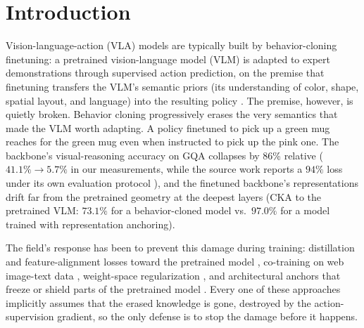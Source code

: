 \documentclass{article}
\begin{document}

\section{Introduction}
\label{sec:intro}

Vision-language-action (VLA) models are typically built by behavior-cloning finetuning: a
pretrained vision-language model (VLM) is adapted to expert demonstrations through supervised
action prediction, on the premise that finetuning transfers the VLM's semantic priors (its
understanding of color, shape, spatial layout, and language) into the resulting policy
\cite{brohan2022rt1,zitkovich2023rt2,driess2023palme,kim2024openvla,wang2025vlaadapter,starvla2026}.
The premise, however, is quietly broken. Behavior cloning progressively erases the very
semantics that made the VLM worth adapting. A policy finetuned to pick up a green mug reaches
for the green mug even when instructed to pick up the pink one. The backbone's
visual-reasoning accuracy on GQA \cite{hudson2019gqa} collapses by 86\% relative
($41.1\% \rightarrow 5.7\%$ in our measurements, while the source work reports a $94\%$ loss
under its own evaluation protocol \cite{dalal2026anchoralign}), and the finetuned backbone's
representations drift far from the pretrained geometry at the deepest layers (CKA
\cite{kornblith2019cka} to the pretrained VLM: $73.1\%$ for a behavior-cloned model vs.\
$97.0\%$ for a model trained with representation anchoring).

The field's response has been to prevent this damage during training: distillation and
feature-alignment losses toward the pretrained model
\cite{hinton2015distill,li2018lwf,mukhoti2024finetuning,kachaev2025donotblind}, co-training
on web image-text data \cite{zitkovich2023rt2,driess2023palme}, weight-space regularization
\cite{kirkpatrick2017ewc,huang2025maps}, and architectural anchors that freeze or shield
parts of the pretrained model
\cite{dalal2026anchoralign,driess2025knowledgeinsulation,grover2025preserving}. Every one of
these approaches implicitly assumes that the erased knowledge is gone, destroyed by the
action-supervision gradient, so the only defense is to stop the damage before it happens.
\end{document}
